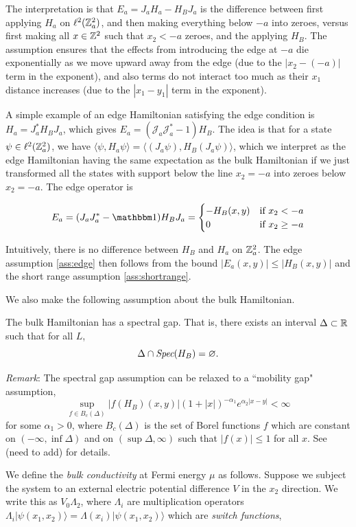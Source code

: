 \documentclass[12pt, letterpaper]{article}
\begin{document}
The interpretation is that $E_a = J_aH_a - H_BJ_a$ is the difference between first applying $H_a$ on $\ell^2(\mathbb{Z}^2_a)$, and then making everything below $-a$ into zeroes, versus first making all $x \in \mathbb{Z}^2$ such that $x_2 < -a$ zeroes, and the applying $H_B$. The assumption ensures that the effects from introducing the edge at $-a$ die exponentially as we move upward away from the edge (due to the $|x_2 - (-a)|$ term in the exponent), and also terms do not interact too much as their $x_1$ distance increases (due to the $|x_1-y_1|$ term in the exponent). 

A simple example of an edge Hamiltonian satisfying the edge condition is $H_a = J_a^*H_BJ_a$, which gives $E_a = (\mathcal{J}_a\mathcal{J}_a^*-1)H_B$. The idea is that for a state $\psi \in \ell^2(\mathbb{Z}^2_a)$, we have $\langle \psi, H_a \psi \rangle = \langle (J_a \psi), H_B (J_a\psi) \rangle$, which we interpret as the edge Hamiltonian having the same expectation as the bulk Hamiltonian if we just transformed all the states with support below the line $x_2=-a$ into zeroes below $x_2=-a$.  The edge operator is 

\[E_a = (J_aJ_a^*-\One)H_BJ_a = \begin{cases} -H_B(x,y) & \text{if } x_2 < -a \\ 0 & \text{if } x_2\geq -a\end{cases}\]

Intuitively, there is no difference between $H_B$ and $H_a$ on $\mathbb{Z}^2_a$. The edge assumption \ref{ass:edge} then follows from the bound $|E_a(x,y)|\leq |H_B(x,y)|$ and the short range assumption \ref{ass:shortrange}.

We also make the following assumption about the bulk Hamiltonian.

\begin{assumption}
The bulk Hamiltonian has a spectral gap. That is, there exists an interval $\Delta \subset \mathbb{R}$ such that for all $L$, 
\[\Delta \cap \emph{Spec}(H_B) = \varnothing.\]
\end{assumption}

\textit{Remark}: The spectral gap assumption can be relaxed to a ``mobility gap" assumption,
\[\sup_{f \in B_c(\Delta)}|f(H_B)(x,y)|(1+|x|)^{-\alpha_1}e^{\alpha_2|x-y|} < \infty\]
for some $\alpha_1>0$, where $B_c(\Delta)$ is the set of Borel functions $f$ which are constant on $(-\infty,\inf \Delta)$ and on $(\sup \Delta, \infty)$ such that $|f(x)| \leq 1$ for all $x$. See (need to add) for details.

We define the \textit{bulk conductivity} at Fermi energy $\mu$ as follows. Suppose we subject the system to an external electric potential difference $V$ in the $x_2$ direction. We write this as $V_0 \Lambda_2$, where $\Lambda_i$ are multiplication operators $\Lambda_i |\psi(x_1,x_2)\rangle = \Lambda(x_i)|\psi(x_1,x_2)\rangle$ which are \textit{switch functions},
\end{document}
